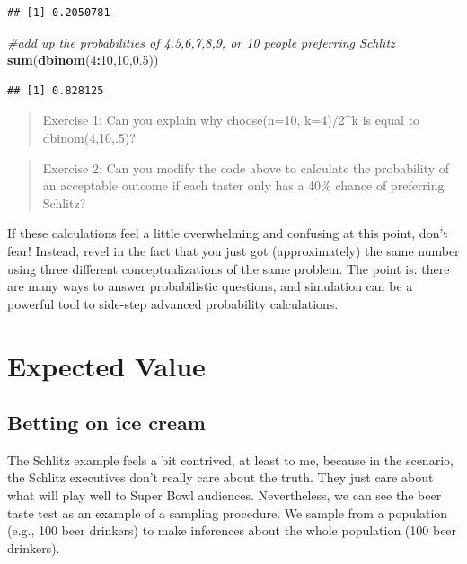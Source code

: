 \documentclass[openany]{book}
\newenvironment{Shaded}{\begin{snugshade}}{\end{snugshade}}
\newcommand{\CommentTok}[1]{\textcolor[rgb]{0.56,0.35,0.01}{\textit{#1}}}
\newcommand{\DecValTok}[1]{\textcolor[rgb]{0.00,0.00,0.81}{#1}}
\newcommand{\FloatTok}[1]{\textcolor[rgb]{0.00,0.00,0.81}{#1}}
\newcommand{\KeywordTok}[1]{\textcolor[rgb]{0.13,0.29,0.53}{\textbf{#1}}}
\newcommand{\NormalTok}[1]{#1}
\newcommand{\OperatorTok}[1]{\textcolor[rgb]{0.81,0.36,0.00}{\textbf{#1}}}
\begin{document}
\begin{verbatim}
## [1] 0.2050781
\end{verbatim}

\begin{Shaded}
\begin{Highlighting}[]
\CommentTok{#add up the probabilities of 4,5,6,7,8,9, or 10 people preferring Schlitz}
\KeywordTok{sum}\NormalTok{(}\KeywordTok{dbinom}\NormalTok{(}\DecValTok{4}\OperatorTok{:}\DecValTok{10}\NormalTok{,}\DecValTok{10}\NormalTok{,}\FloatTok{0.5}\NormalTok{))}
\end{Highlighting}
\end{Shaded}

\begin{verbatim}
## [1] 0.828125
\end{verbatim}

\begin{quote}
Exercise 1: Can you explain why choose(n=10, k=4)/2\^{}k is equal to dbinom(4,10,.5)?
\end{quote}

\begin{quote}
Exercise 2: Can you modify the code above to calculate the probability of an acceptable outcome if each taster only has a 40\% chance of preferring Schlitz?
\end{quote}

If these calculations feel a little overwhelming and confusing at this point, don't fear! Instead, revel in the fact that you just got (approximately) the same number using three different conceptualizations of the same problem. The point is: there are many ways to answer probabilistic questions, and simulation can be a powerful tool to side-step advanced probability calculations.

\hypertarget{expected-value}{%
\chapter{Expected Value}\label{expected-value}}

\hypertarget{betting-on-ice-cream}{%
\section*{Betting on ice cream}\label{betting-on-ice-cream}}

The Schlitz example feels a bit contrived, at least to me, because in the scenario, the Schlitz executives don't really care about the truth. They just care about what will play well to Super Bowl audiences. Nevertheless, we can see the beer taste test as an example of a sampling procedure. We sample from a population (e.g., 100 beer drinkers) to make inferences about the whole population (100 beer drinkers).
\end{document}
